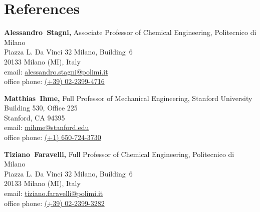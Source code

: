 \section{\sc References}

\vspace*{.05in}
\parbox{\textwidth}
{
    {\bf Alessandro~Stagni,} Associate Professor of Chemical Engineering, Politecnico di Milano \\
    Piazza L. Da Vinci 32 Milano, Building\ 6 \\
    20133 Milano (MI), Italy \\
    email: \href{mailto:alessandro.stagni@polimi.it}{alessandro.stagni@polimi.it} \\
    office phone: \href{tel:+390223994716}{(+39) 02-2399-4716}
}
\par
\parbox{\textwidth}
{
    {\bf Matthias~Ihme,} Full Professor of Mechanical Engineering, Stanford University \\
    Building 530, Office 225 \\
    Stanford, CA 94395\\
    email: \href{mailto:mihme@stanford.edu}{mihme@stanford.edu}\\
    office phone: \href{tel:+16507243730}{(+1) 650-724-3730}
}
\par
\parbox{\textwidth}
{
    {\bf Tiziano~Faravelli,} Full Professor of Chemical Engineering, Politecnico di Milano \\
    Piazza L. Da Vinci 32 Milano, Building\ 6 \\
    20133 Milano (MI), Italy \\
    email: \href{mailto:tiziano.faravelli@polimi.it}{tiziano.faravelli@polimi.it} \\
    office phone: \href{tel:+390223993282}{(+39) 02-2399-3282}
}
